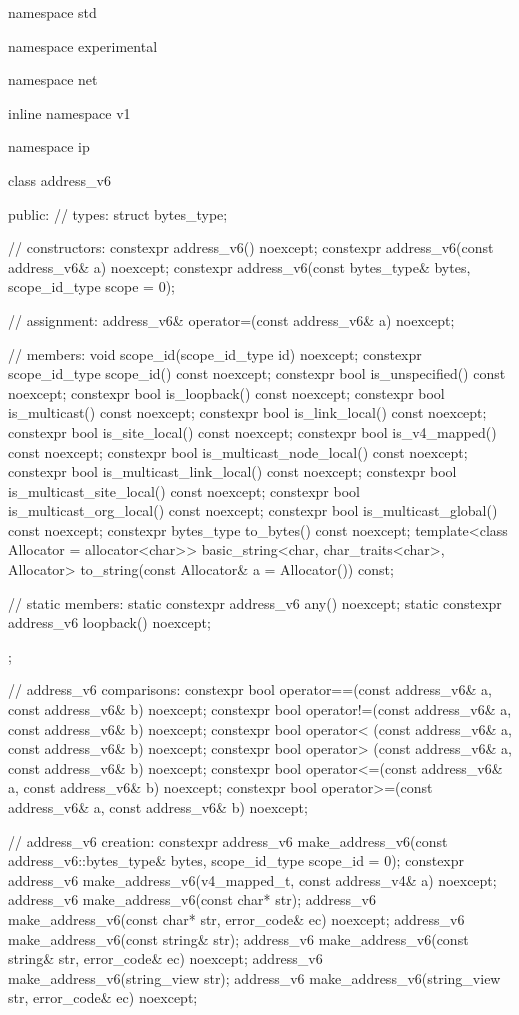 %
\begin{codeblock}
namespace std {
namespace experimental {
namespace net {
inline namespace v1 {
namespace ip {

  class address_v6
  {
  public:
    // types:
    struct bytes_type;

    // constructors:
    constexpr address_v6() noexcept;
    constexpr address_v6(const address_v6& a) noexcept;
    constexpr address_v6(const bytes_type& bytes,
                         scope_id_type scope = 0);

    // assignment:
    address_v6& operator=(const address_v6& a) noexcept;

    // members:
    void scope_id(scope_id_type id) noexcept;
    constexpr scope_id_type scope_id() const noexcept;
    constexpr bool is_unspecified() const noexcept;
    constexpr bool is_loopback() const noexcept;
    constexpr bool is_multicast() const noexcept;
    constexpr bool is_link_local() const noexcept;
    constexpr bool is_site_local() const noexcept;
    constexpr bool is_v4_mapped() const noexcept;
    constexpr bool is_multicast_node_local() const noexcept;
    constexpr bool is_multicast_link_local() const noexcept;
    constexpr bool is_multicast_site_local() const noexcept;
    constexpr bool is_multicast_org_local() const noexcept;
    constexpr bool is_multicast_global() const noexcept;
    constexpr bytes_type to_bytes() const noexcept;
    template<class Allocator = allocator<char>>
      basic_string<char, char_traits<char>, Allocator>
        to_string(const Allocator& a = Allocator()) const;

    // static members:
    static constexpr address_v6 any() noexcept;
    static constexpr address_v6 loopback() noexcept;
  };

  // address_v6 comparisons:
  constexpr bool operator==(const address_v6& a, const address_v6& b) noexcept;
  constexpr bool operator!=(const address_v6& a, const address_v6& b) noexcept;
  constexpr bool operator< (const address_v6& a, const address_v6& b) noexcept;
  constexpr bool operator> (const address_v6& a, const address_v6& b) noexcept;
  constexpr bool operator<=(const address_v6& a, const address_v6& b) noexcept;
  constexpr bool operator>=(const address_v6& a, const address_v6& b) noexcept;

  // address_v6 creation:
  constexpr address_v6 make_address_v6(const address_v6::bytes_type& bytes,
                                       scope_id_type scope_id = 0);
  constexpr address_v6 make_address_v6(v4_mapped_t, const address_v4& a) noexcept;
  address_v6 make_address_v6(const char* str);
  address_v6 make_address_v6(const char* str, error_code& ec) noexcept;
  address_v6 make_address_v6(const string& str);
  address_v6 make_address_v6(const string& str, error_code& ec) noexcept;
  address_v6 make_address_v6(string_view str);
  address_v6 make_address_v6(string_view str, error_code& ec) noexcept;

}}}}}
\end{codeblock}
